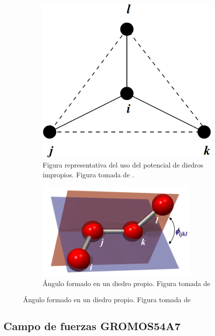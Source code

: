 \begin{figure}[!h]
\textwidth
\captionsetup[subfigure]{width=0.7\imagewidth,justification=raggedright}
\begin{subfigure}{.5\textwidth}
  \centering
  \includegraphics[width=.7\linewidth]{MD/improperdihedralanglepotential2.png}  
  \caption{Figura representativa del uso del potencial de diedros impropios. Figura tomada de \cite{gromacsdoc}.}
  \label{fig:improperdihedralanglepotential}
\end{subfigure}
\begin{subfigure}{.5\textwidth}
  \centering
  \includegraphics[width=.8\linewidth]{MD/properdihedral.png}  
  \caption{Ángulo formado en un diedro propio. Figura tomada de \cite{charmmgui}}
  \label{fig:properdihedral}
\end{subfigure}
\end{figure}

\subsection{Campo de fuerzas GROMOS54A7}

